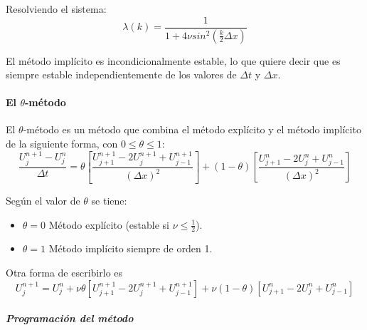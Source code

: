 Resolviendo el sistema:
$$\lambda(k) = \frac{1}{1+4\nu sin^2\left(\frac{k}{2}\Delta x\right)}$$

El método implícito es incondicionalmente estable, lo que quiere decir que es siempre estable independientemente de los valores de $\Delta t$ y $\Delta x$.

\paragraph{El $\theta$-método}\mbox{}

El $\theta$-método es un método que combina el método explícito y el método implícito de la siguiente forma, con $0\le\theta\le 1$:
$$\frac{U_j^{n+1}-U_j^n}{\Delta t} = 
\theta \left[\frac{U_{j+1}^{n+1}-2U_{j}^{n+1}+U_{j-1}^{n+1}}{(\Delta x)^2}\right] +
(1-\theta) \left[ \frac{U_{j+1}^n-2U_j^n+U_{j-1}^n}{(\Delta x)^2}\right]$$

Según el valor de $\theta$ se tiene:
\begin{itemize}
	\vspace{-3mm}
	\item $\theta = 0$ Método explícito (estable si $\nu \le \frac{1}{2}$).
	\item $\theta = 1$ Método implícito siempre de orden 1.
\end{itemize}

Otra forma de escribirlo es
$$U_j^{n+1} = U_j^n + \nu\theta\left[U_{j+1}^{n+1} - 2U_{j}^{n+1} + U_{j-1}^{n+1}\right] + \nu(1-\theta)\left[U_{j+1}^{n}-2U_{j}^{n}+U_{j-1}^{n}\right]$$

\subparagraph{Programación del método}\mbox{}

